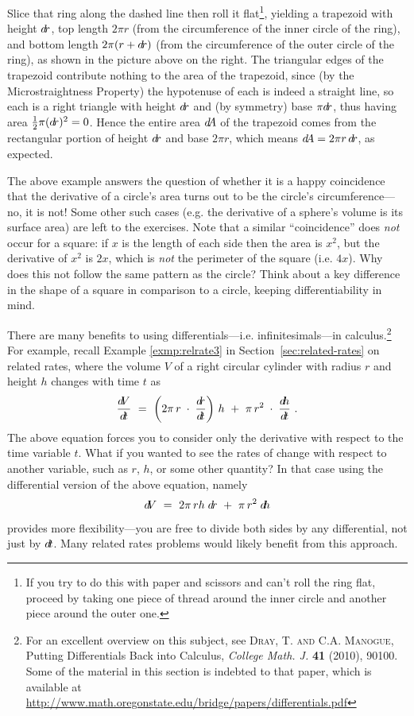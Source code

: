 \begin{exmp}
Slice that ring along the dashed line then roll it flat\footnote{If
you try to do this with paper and scissors and can't roll the ring
flat, proceed by taking one piece of thread around the inner circle
and another piece around the outer one.}, yielding a trapezoid
with height $d\!r$, top length $2\pi r$ (from the circumference of the inner
circle of the ring), and bottom length $2\pi(r+d\!r)$ (from the circumference of
the outer circle of the ring), as shown in the picture above on the right. The
triangular edges of the trapezoid contribute nothing to the area of the
trapezoid, since (by the Microstraightness Property) the hypotenuse of each is
indeed a straight line, so each is a right triangle with height $d\!r$ and (by
symmetry) base $\pi d\!r$, thus having area $\frac{1}{2}\pi(d\!r)^2 = 0$. Hence the
entire area $d\negmedspace A$ of the trapezoid comes from the rectangular
portion of height $d\!r$ and base $2\pi r$, which means
$d\negmedspace A = 2\pi r\,d\!r$, as expected.
\end{exmp}
\vspace{-1em}
\divider
\vspace{3mm}

The above example answers the question of whether it is a happy coincidence that
the derivative of a circle's area turns out to be the circle's
circumference---no, it is not! Some other such cases (e.g. the derivative of a
sphere's volume is its surface area) are left to the exercises. Note that a
similar ``coincidence'' does \emph{not} occur for a square: if $x$ is the length
of each side then the area is $x^2$, but the derivative of $x^2 $ is $2x$, which
is \emph{not} the perimeter of the square (i.e. $4x$). Why does this not follow
the same pattern as the circle? Think about a key difference in the shape of a
square in comparison to a circle, keeping differentiability in mind.

There are many benefits to using differentials---i.e. infinitesimals---in
calculus.\footnote{For an excellent overview on this subject, see \textsc{Dray,
T. and C.A. Manogue}, Putting Differentials Back into Calculus,
\emph{College Math. J.} \textbf{41} (2010), 90100. Some of the
material in this section is indebted to that paper, which is available at
\url{http://www.math.oregonstate.edu/bridge/papers/differentials.pdf}} For
example, recall Example \ref{exmp:relrate3} in Section~\ref{sec:related-rates} on related rates,
where the volume $V$ of a right circular cylinder with radius $r$ and height
$h$ changes with time $t$ as
\[
\frac{d\negmedspace V}{d\!t} ~=~ \left( 2\pi \,r\;\cdot\;\frac{d\negmedspace r}{d\!t}\right)\,h ~+~
 \pi\,r^2 \;\cdot\;\frac{d\negmedspace h}{d\!t} ~.
\]
The above equation forces you to consider only the derivative with respect
to the time variable $t$. What if you wanted to see the rates of change with
respect to another variable, such as $r$, $h$, or some other quantity?
In that case using the differential version of the above equation, namely
\[
d\negmedspace V ~=~ 2\pi \,rh\;d\!r ~+~ \pi\,r^2 \;d\negmedspace h
\]
provides more flexibility---you are free to divide both sides by any
differential, not just by $d\!t$. Many related rates problems would likely
benefit from this approach.


